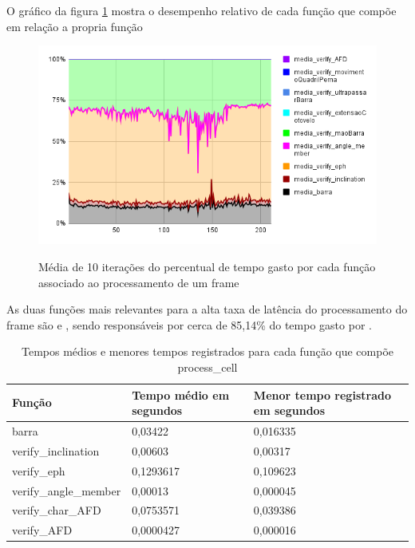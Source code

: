 O gráfico da figura \ref{graf:G14} mostra o desempenho relativo de cada função que compõe  em relação a propria função 

\begin{figure}[H]
	\centering
	\caption{Média de 10 iterações do percentual de tempo gasto por cada função associado ao processamento de um frame}
	\includegraphics[scale=0.7]{figuras/grafico/comp_process_cell_1.png}
	\label{graf:G14}
\end{figure}

As duas funções mais relevantes para a alta taxa de latência do processamento do frame são  e , sendo responsáveis por cerca de 85,14\% do tempo gasto por .

\begin{table}[h]
	\centering
	\begin{tabular}{|p{6cm}|p{3cm}|p{5cm}|}
	\hline
	\textbf{Função} & \textbf{Tempo médio em segundos} & \textbf{Menor tempo registrado em segundos} \\
	\hline
	barra & 0,03422 & 0,016335 \\
	verify\_inclination & 0,00603 & 0,00317 \\
	verify\_eph & 0,1293617 & 0,109623 \\
	verify\_angle\_member & 0,00013 & 0,000045 \\
	verify\_char\_AFD & 0,0753571 & 0,039386 \\
	verify\_AFD & 0,0000427 & 0,000016 \\
	\hline
	\end{tabular}
	\caption{Tempos médios e menores tempos registrados para cada função que compõe process\_cell}
	\label{tab:tempos_funcoes}
\end{table}



